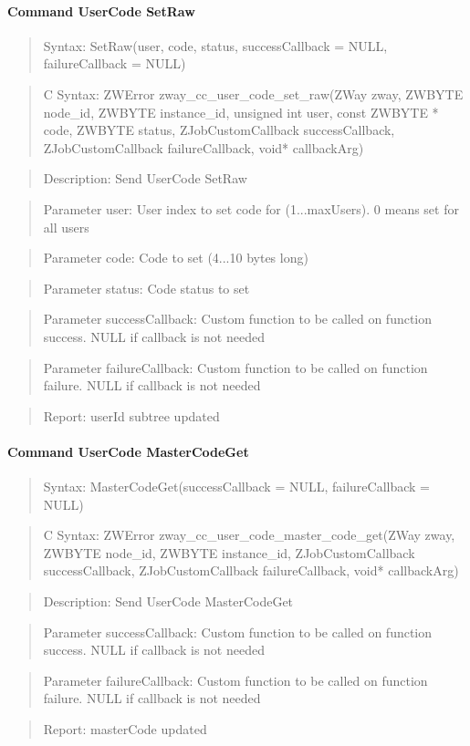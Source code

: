 \paragraph{Command UserCode SetRaw}
\begin{quote}Syntax: SetRaw(user, code, status, successCallback = NULL, failureCallback = NULL)\end{quote}
\begin{quote}C Syntax: ZWError zway\_cc\_user\_code\_set\_raw(ZWay zway, ZWBYTE node\_id, ZWBYTE instance\_id, unsigned int user, const ZWBYTE * code, ZWBYTE status, ZJobCustomCallback successCallback, ZJobCustomCallback failureCallback, void* callbackArg)\end{quote}
\begin{quote}Description: Send UserCode SetRaw\end{quote}
\begin{quote}Parameter user: User index to set code for (1...maxUsers). 0 means set for all users\end{quote}
\begin{quote}Parameter code: Code to set (4...10 bytes long)\end{quote}
\begin{quote}Parameter status: Code status to set\end{quote}
\begin{quote}Parameter successCallback: Custom function to be called on function success. NULL if callback is not needed\end{quote}
\begin{quote}Parameter failureCallback: Custom function to be called on function failure. NULL if callback is not needed\end{quote}
\begin{quote}Report: userId subtree updated\end{quote}

\paragraph{Command UserCode MasterCodeGet}
\begin{quote}Syntax: MasterCodeGet(successCallback = NULL, failureCallback = NULL)\end{quote}
\begin{quote}C Syntax: ZWError zway\_cc\_user\_code\_master\_code\_get(ZWay zway, ZWBYTE node\_id, ZWBYTE instance\_id, ZJobCustomCallback successCallback, ZJobCustomCallback failureCallback, void* callbackArg)\end{quote}
\begin{quote}Description: Send UserCode MasterCodeGet\end{quote}
\begin{quote}Parameter successCallback: Custom function to be called on function success. NULL if callback is not needed\end{quote}
\begin{quote}Parameter failureCallback: Custom function to be called on function failure. NULL if callback is not needed\end{quote}
\begin{quote}Report: masterCode updated\end{quote}

